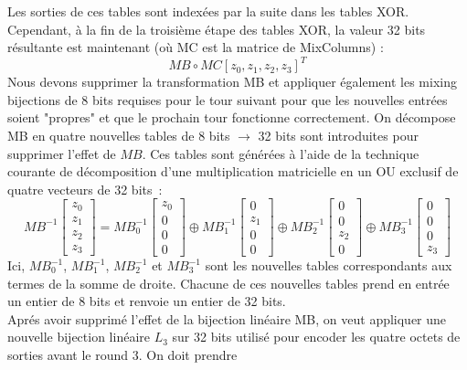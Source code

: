 \documentclass[a4paper, 10pt]{article}
\begin{document}
\normalsize
Les sorties de ces tables sont indexées par la suite dans les tables XOR. Cependant, à la fin de la troisième 
étape des tables XOR, la valeur 32 bits résultante est maintenant (où MC est la matrice de MixColumns) :
\[ MB \circ MC[z_0, z_1, z_2, z_3]^{T}\]
Nous devons supprimer la transformation MB et appliquer également les mixing bijections de 8 bits 
requises pour le tour suivant pour que les nouvelles entrées soient "propres" et que le prochain tour fonctionne 
correctement. On décompose MB en quatre nouvelles tables de 8 bits $\rightarrow$ 32 bits sont introduites pour 
supprimer l'effet de \(MB\). Ces tables sont générées à l'aide de la technique courante de 
décomposition d'une multiplication matricielle en un OU exclusif de quatre vecteurs de 32 bits :
\[
  MB^{-1} \begin{bmatrix} z_0 \\ z_1 \\ z_2 \\ z_3 \end{bmatrix}
  = MB_{0}^{-1} \begin{bmatrix} z_0 \\ 0 \\ 0 \\ 0 \end{bmatrix}
  \oplus MB_{1}^{-1} \begin{bmatrix} 0 \\ z_1 \\ 0 \\ 0 \end{bmatrix}
  \oplus MB_{2}^{-1} \begin{bmatrix} 0 \\ 0 \\ z_2 \\ 0 \end{bmatrix}
  \oplus MB_{3}^{-1} \begin{bmatrix} 0 \\ 0 \\ 0 \\ z_3 \end{bmatrix}
\]
Ici, \(MB_{0}^{-1}\), \(MB_{1}^{-1}\), \(MB_{2}^{-1}\) et \(MB_{3}^{-1}\) sont les nouvelles tables correspondants 
aux termes de la somme de droite. Chacune de ces nouvelles tables prend en entrée un entier de 8 bits et renvoie
un entier de 32 bits.\\

Aprés avoir supprimé l'effet de la bijection linéaire MB, on veut appliquer une nouvelle bijection 
linéaire \(L_{3}\) sur 32 bits utilisé pour encoder les quatre octets de sorties avant le round 3. On doit prendre 
\end{document}
